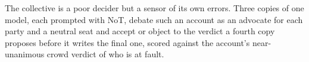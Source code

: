 The collective is a poor decider but a sensor of
its own errors. Three copies
of one model, each prompted with NoT, debate such an account as an advocate for each
party and a neutral seat and accept or object to the verdict a fourth copy
proposes before it writes the final one, scored against the account's
near-unanimous crowd verdict of who is at fault.
